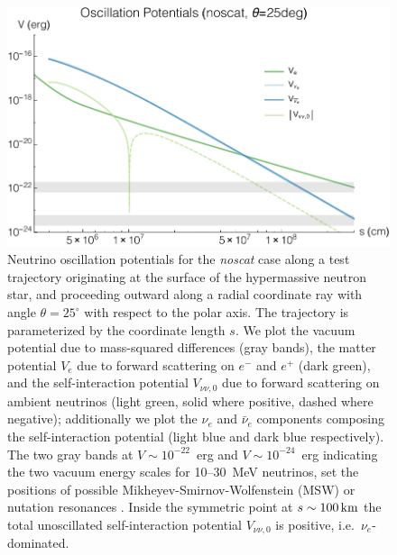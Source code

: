 \documentclass[aps,floatfix,prd,superscriptaddress,twocolumn]{revtex4-1}
\begin{document}
\begin{figure}
  \includegraphics[width=\columnwidth]{20171223-potentials-Ve_Vnue_Vnua_Vnu-000Mo-025deg-noscat}
  \caption{Neutrino oscillation potentials
    for the \emph{noscat} case
    along a test trajectory
    originating at the surface of the hypermassive neutron star, and
    proceeding outward along a radial coordinate ray with angle
    $\theta=25^{\circ}$ with respect to the polar axis.
    The trajectory is parameterized by the coordinate length $s$.
    We plot the vacuum potential due to mass-squared differences (gray bands),
    the matter potential $V_e$ due to forward scattering on $e^-$ and $e^+$
    (dark green),
    and the self-interaction potential $V_{\nu\nu,0}$ due to forward
    scattering on ambient neutrinos (light green, solid where positive,
    dashed where negative);
    additionally we plot the $\nu_e$ and $\bar{\nu}_e$ components composing
    the self-interaction potential (light blue and dark blue respectively).
    The two gray bands at $V\sim10^{-22}$~erg and $V\sim10^{-24}$~erg
    indicating the two vacuum energy scales for 10--30~MeV neutrinos,
    set the positions of possible Mikheyev-Smirnov-Wolfenstein (MSW)
    or nutation resonances \cite{malk2012-mnr_1}.
    Inside the symmetric point at $s\sim100\,{\rm km}$ the total unoscillated
    self-interaction potential $V_{\nu\nu,0}$ is positive,
    i.e.\ $\nu_e$-dominated.
    }
  \label{fig:V_nunu-noscat}
\end{figure}
\end{document}
